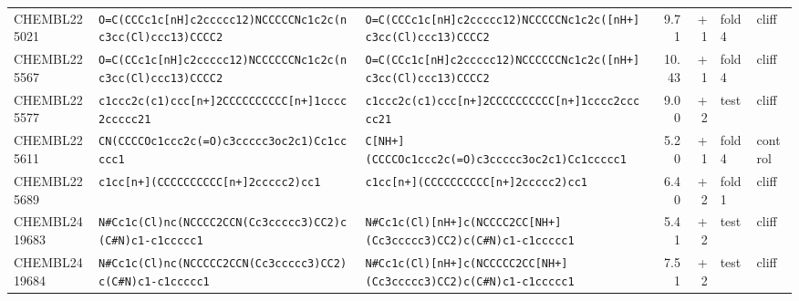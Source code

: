 \begin{longtable}{l p{4.4cm} p{4.4cm} r r l l}
CHEMBL225021 & \texttt{O=\allowbreak{}C(\allowbreak{}CCCc1c[nH]\allowbreak{}c2ccccc12)\allowbreak{}NCCCCCNc1c2c(\allowbreak{}nc3cc(\allowbreak{}Cl)\allowbreak{}ccc13)\allowbreak{}CCCC2} & \texttt{O=\allowbreak{}C(\allowbreak{}CCCc1c[nH]\allowbreak{}c2ccccc12)\allowbreak{}NCCCCCNc1c2c(\allowbreak{}[nH+]\allowbreak{}c3cc(\allowbreak{}Cl)\allowbreak{}ccc13)\allowbreak{}CCCC2} & 9.71 & +1 & fold 4 & cliff \\
CHEMBL225567 & \texttt{O=\allowbreak{}C(\allowbreak{}CCc1c[nH]\allowbreak{}c2ccccc12)\allowbreak{}NCCCCCCNc1c2c(\allowbreak{}nc3cc(\allowbreak{}Cl)\allowbreak{}ccc13)\allowbreak{}CCCC2} & \texttt{O=\allowbreak{}C(\allowbreak{}CCc1c[nH]\allowbreak{}c2ccccc12)\allowbreak{}NCCCCCCNc1c2c(\allowbreak{}[nH+]\allowbreak{}c3cc(\allowbreak{}Cl)\allowbreak{}ccc13)\allowbreak{}CCCC2} & 10.43 & +1 & fold 4 & cliff \\
CHEMBL225577 & \texttt{c1ccc2c(\allowbreak{}c1)\allowbreak{}ccc[n+]\allowbreak{}2CCCCCCCCCC[n+]\allowbreak{}1cccc2ccccc21} & \texttt{c1ccc2c(\allowbreak{}c1)\allowbreak{}ccc[n+]\allowbreak{}2CCCCCCCCCC[n+]\allowbreak{}1cccc2ccccc21} & 9.00 & +2 & test & cliff \\
CHEMBL225611 & \texttt{CN(\allowbreak{}CCCCOc1ccc2c(\allowbreak{}=\allowbreak{}O)\allowbreak{}c3ccccc3oc2c1)\allowbreak{}Cc1ccccc1} & \texttt{C[NH+]\allowbreak{}(\allowbreak{}CCCCOc1ccc2c(\allowbreak{}=\allowbreak{}O)\allowbreak{}c3ccccc3oc2c1)\allowbreak{}Cc1ccccc1} & 5.20 & +1 & fold 4 & control \\
CHEMBL225689 & \texttt{c1cc[n+]\allowbreak{}(\allowbreak{}CCCCCCCCCC[n+]\allowbreak{}2ccccc2)\allowbreak{}cc1} & \texttt{c1cc[n+]\allowbreak{}(\allowbreak{}CCCCCCCCCC[n+]\allowbreak{}2ccccc2)\allowbreak{}cc1} & 6.40 & +2 & fold 1 & cliff \\
CHEMBL2419683 & \texttt{N\#Cc1c(\allowbreak{}Cl)\allowbreak{}nc(\allowbreak{}NCCCC2CCN(\allowbreak{}Cc3ccccc3)\allowbreak{}CC2)\allowbreak{}c(\allowbreak{}C\#N)\allowbreak{}c1-c1ccccc1} & \texttt{N\#Cc1c(\allowbreak{}Cl)\allowbreak{}[nH+]\allowbreak{}c(\allowbreak{}NCCCC2CC[NH+]\allowbreak{}(\allowbreak{}Cc3ccccc3)\allowbreak{}CC2)\allowbreak{}c(\allowbreak{}C\#N)\allowbreak{}c1-c1ccccc1} & 5.41 & +2 & test & cliff \\
CHEMBL2419684 & \texttt{N\#Cc1c(\allowbreak{}Cl)\allowbreak{}nc(\allowbreak{}NCCCCC2CCN(\allowbreak{}Cc3ccccc3)\allowbreak{}CC2)\allowbreak{}c(\allowbreak{}C\#N)\allowbreak{}c1-c1ccccc1} & \texttt{N\#Cc1c(\allowbreak{}Cl)\allowbreak{}[nH+]\allowbreak{}c(\allowbreak{}NCCCCC2CC[NH+]\allowbreak{}(\allowbreak{}Cc3ccccc3)\allowbreak{}CC2)\allowbreak{}c(\allowbreak{}C\#N)\allowbreak{}c1-c1ccccc1} & 7.51 & +2 & test & cliff \\

\end{longtable}
